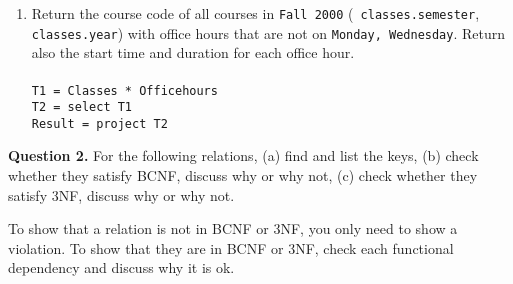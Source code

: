 \documentclass[11pt]{article}
\begin{document}
\begin{enumerate} [label=\Alph*]
\item Return the course code of all courses in {\tt Fall 2000} ({\tt
  classes.semester}, {\tt classes.year}) with office hours that are
  not on {\tt Monday, Wednesday}. Return also the start time and duration
  for each office hour. \\\\
\texttt{T1 = Classes * Officehours} \\
\texttt{T2 = select T1} \\
\texttt{Result = project T2} \\
\end{enumerate}

{\bf Question 2.} For the following relations, (a) find and list the
keys, (b) check whether they satisfy BCNF, discuss why or why not, (c)
check whether they satisfy 3NF, discuss why or why not.

To show that a relation is not in BCNF or 3NF, you only need to show a
violation. To show that they are in BCNF or 3NF, check each functional
dependency and discuss why it is ok.
\end{document}
